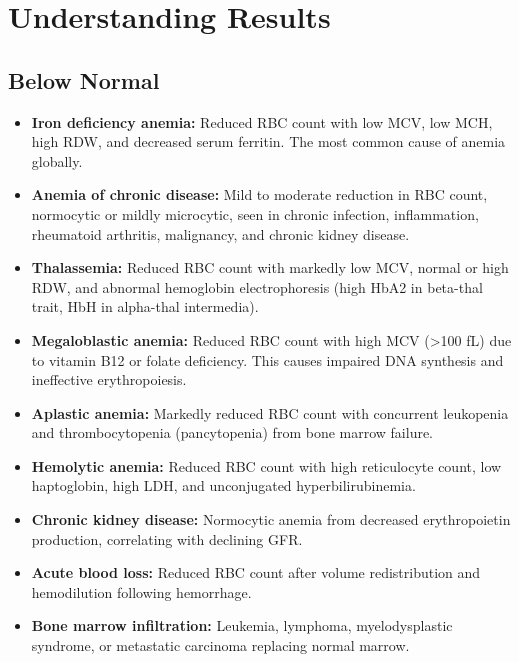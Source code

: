 \section*{Understanding Results}

\subsection*{Below Normal}
\begin{itemize}
  \item \textbf{Iron deficiency anemia:} Reduced RBC count with low MCV, low MCH, high RDW, and decreased serum ferritin. The most common cause of anemia globally.
  \item \textbf{Anemia of chronic disease:} Mild to moderate reduction in RBC count, normocytic or mildly microcytic, seen in chronic infection, inflammation, rheumatoid arthritis, malignancy, and chronic kidney disease.
  \item \textbf{Thalassemia:} Reduced RBC count with markedly low MCV, normal or high RDW, and abnormal hemoglobin electrophoresis (high HbA2 in beta-thal trait, HbH in alpha-thal intermedia).
  \item \textbf{Megaloblastic anemia:} Reduced RBC count with high MCV (>100 fL) due to vitamin B12 or folate deficiency. This causes impaired DNA synthesis and ineffective erythropoiesis.
  \item \textbf{Aplastic anemia:} Markedly reduced RBC count with concurrent leukopenia and thrombocytopenia (pancytopenia) from bone marrow failure.
  \item \textbf{Hemolytic anemia:} Reduced RBC count with high reticulocyte count, low haptoglobin, high LDH, and unconjugated hyperbilirubinemia.
  \item \textbf{Chronic kidney disease:} Normocytic anemia from decreased erythropoietin production, correlating with declining GFR.
  \item \textbf{Acute blood loss:} Reduced RBC count after volume redistribution and hemodilution following hemorrhage.
  \item \textbf{Bone marrow infiltration:} Leukemia, lymphoma, myelodysplastic syndrome, or metastatic carcinoma replacing normal marrow.
\end{itemize}

